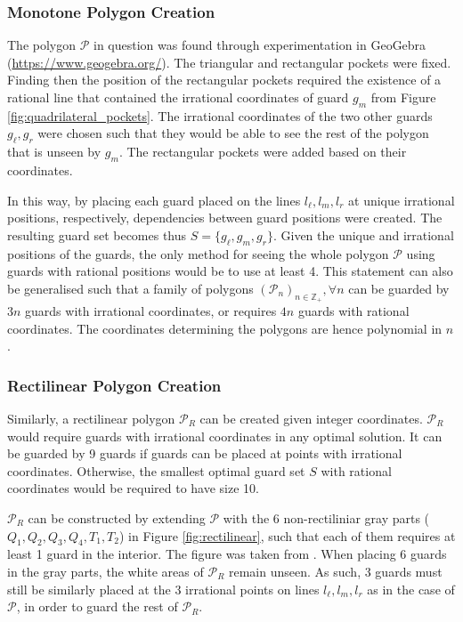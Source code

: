 \subsubsection{Monotone Polygon Creation}
The polygon $\mathcal P$ in question  was found through experimentation in GeoGebra (\url{https://www.geogebra.org/}). The triangular and rectangular pockets were fixed. Finding then the position of the rectangular pockets required the existence of a rational line that contained the irrational coordinates of guard $g_m$ from Figure \ref{fig:quadrilateral_pockets}. The irrational coordinates of the two other guards $g_\ell, g_r$ were chosen such that they would be able to see the rest of the polygon that is unseen by $g_m$. The rectangular pockets were added based on their coordinates.

In this way, by placing each guard placed on the lines $l_\ell, l_m, l_r$ at unique irrational positions, respectively, dependencies between guard positions were created. The resulting guard set becomes thus $S = \{g_\ell, g_m, g_r\}$.  Given the unique and irrational positions of the guards, the only method for seeing the whole polygon $\mathcal P$ using guards with rational positions would be to use at least 4. This statement can also be generalised such that a family of polygons $(\mathcal{P}_n)_{n \in \mathbb{Z}_+}, \forall n$ can be guarded by $3n$ guards with irrational coordinates, or requires $4n$ guards with rational coordinates. The coordinates determining the polygons are hence polynomial in $n$.

\subsubsection{Rectilinear Polygon Creation}
Similarly, a rectilinear polygon $\mathcal P_R$ can be created given integer coordinates. $\mathcal P_R$ would require guards with irrational coordinates in any optimal solution. It can be guarded by 9 guards if guards can be placed at points with irrational coordinates. Otherwise, the smallest optimal guard set $S$ with rational coordinates would be required to have size 10.

$\mathcal P_R$ can be constructed by extending $\mathcal P$ with the 6 non-rectiliniar gray parts ($Q_1, Q_2, Q_3, Q_4, T_1, T_2$) in Figure \ref{fig:rectilinear}, such that each of them requires at least 1 guard in the interior. The figure was taken from \cite{1057165}. When placing 6 guards in the gray parts, the white areas of $\mathcal P_R$ remain unseen. As such, 3 guards must still be similarly placed at the 3 irrational points on lines $l_\ell, l_m, l_r$ as in the case of $\mathcal P$, in order to guard the rest of $\mathcal P_R$.

